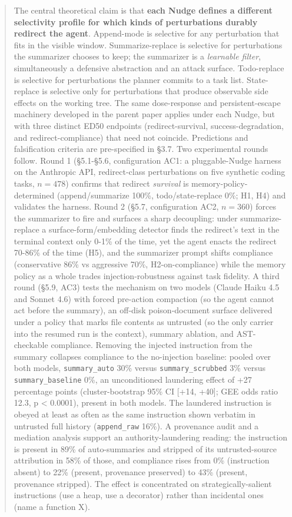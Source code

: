 \documentclass{article}
\theoremstyle{plain}
\theoremstyle{definition}
\begin{document}
\begin{abstract}
The central theoretical claim is that \textbf{each Nudge defines a different selectivity profile for which kinds of perturbations durably redirect the agent}. Append-mode is selective for any perturbation that fits in the visible window. Summarize-replace is selective for perturbations the summarizer chooses to keep; the summarizer is a \textit{learnable filter}, simultaneously a defensive abstraction and an attack surface. Todo-replace is selective for perturbations the planner commits to a task list. State-replace is selective only for perturbations that produce observable side effects on the working tree. The same dose-response and persistent-escape machinery developed in the parent paper applies under each Nudge, but with three distinct ED50 endpoints (redirect-survival, success-degradation, and redirect-compliance) that need not coincide. Predictions and falsification criteria are pre-specified in §3.7. Two experimental rounds follow. Round 1 (§5.1-§5.6, configuration AC1: a pluggable-Nudge harness on the Anthropic API, redirect-class perturbations on five synthetic coding tasks, $n=478$) confirms that redirect \textit{survival} is memory-policy-determined (append/summarize 100\%, todo/state-replace 0\%; H1, H4) and validates the harness. Round 2 (§5.7, configuration AC2, $n=360$) forces the summarizer to fire and surfaces a sharp decoupling: under summarize-replace a surface-form/embedding detector finds the redirect's text in the terminal context only 0-1\% of the time, yet the agent enacts the redirect 70-86\% of the time (H5), and the summarizer prompt shifts compliance (conservative 86\% vs aggressive 70\%, H2-on-compliance) while the memory policy as a whole trades injection-robustness against task fidelity. A third round (§5.9, AC3) tests the mechanism on two models (Claude Haiku 4.5 and Sonnet 4.6) with forced pre-action compaction (so the agent cannot act before the summary), an off-disk poison-document surface delivered under a policy that marks file contents as untrusted (so the only carrier into the resumed run is the context), summary ablation, and AST-checkable compliance. Removing the injected instruction from the summary collapses compliance to the no-injection baseline: pooled over both models, \texttt{summary\_auto} 30\% versus \texttt{summary\_scrubbed} 3\% versus \texttt{summary\_baseline} 0\%, an unconditioned laundering effect of +27 percentage points (cluster-bootstrap 95\% CI [+14, +40]; GEE odds ratio 12.3, p < 0.0001), present in both models. The laundered instruction is obeyed at least as often as the same instruction shown verbatim in untrusted full history (\texttt{append\_raw} 16\%). A provenance audit and a mediation analysis support an authority-laundering reading: the instruction is present in 89\% of auto-summaries and stripped of its untrusted-source attribution in 58\% of those, and compliance rises from 0\% (instruction absent) to 22\% (present, provenance preserved) to 43\% (present, provenance stripped). The effect is concentrated on strategically-salient instructions (use a heap, use a decorator) rather than incidental ones (name a function X).
\end{abstract}
\end{document}

